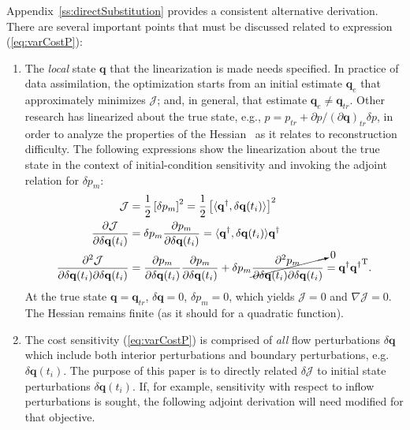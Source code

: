 Appendix~\ref{ss:directSubstitution} provides a consistent alternative derivation. There are several important points that must be discussed related to expression (\ref{eq:varCostP}):
\begin{tcolorbox}[colback=white,sharp corners]
\begin{enumerate}
    \item The \textit{local} state $\mathbf{q}$ that the linearization is made needs specified. In practice of data assimilation, the optimization starts from an initial estimate $\mathbf{q}_e$ that approximately minimizes $\mathcal{J}$; and, in general, that estimate $\mathbf{q}_e \neq \mathbf{q}_{tr}$. Other research has linearized about the true state, e.g., ${p}={p}_{tr}+\partial{p}/(\partial{\mathbf{q}})_{tr}\delta p$, in order to analyze the properties of the Hessian~\citep{wang2021wall} as it relates to reconstruction difficulty. The following expressions show the linearization about the true state in the context of initial-condition sensitivity and invoking the adjoint relation for $\delta p_m$:
    \begin{align*}
\mathcal{J} &= \frac{1}{2} \left[\delta p_m\right]^2 = \frac{1}{2} \left[\langle \mathbf{q}^\dagger, \delta\mathbf{q}(t_i)\rangle\right]^2\\
\frac{\partial \mathcal{J}}{\partial \delta \mathbf{q}(t_i)} &= \delta p_m \frac{ \partial p_m}{\partial \delta \mathbf{q}(t_i)} =  \langle \mathbf{q}^\dagger, \delta\mathbf{q}(t_i)\rangle\mathbf{q}^\dagger\\
\frac{\partial^2 \mathcal{J}}{\partial \delta \mathbf{q}(t_i)\partial \delta \mathbf{q}(t_i)} &= \frac{ \partial p_m}{\partial \delta \mathbf{q}(t_i)} \frac{ \partial p_m}{\partial \delta \mathbf{q}(t_i)}+\delta p_m \cancelto{0}{\frac{ \partial^2 p_m}{\partial \delta \mathbf{q}(t_i)\partial \delta \mathbf{q}(t_i)}} =   \mathbf{q}^\dagger{\mathbf{q}^\dagger}^{\mathrm{T}}.
\end{align*}
At the true state $\mathbf{q}=\mathbf{q}_{tr}$, $\delta\mathbf{q}=0$, $\delta p_m=0$, which yields $\mathcal{J}=0$ and $\nabla\mathcal{J}=0$. The Hessian remains finite (as it should for a quadratic function).
\vspace{6pt}
    \item The cost sensitivity (\ref{eq:varCostP}) is comprised of \textit{all} flow perturbations $\delta \mathbf{q}$ which include both interior perturbations and boundary perturbations, e.g. $\delta \mathbf{q}(t_i)$. The purpose of this paper is to directly related $\delta \mathcal{J}$ to initial state perturbations $\delta \mathbf{q}(t_i)$. If, for example, sensitivity with respect to inflow perturbations is sought, the following adjoint derivation will need modified for that objective.  
\end{enumerate}  
\end{tcolorbox}

